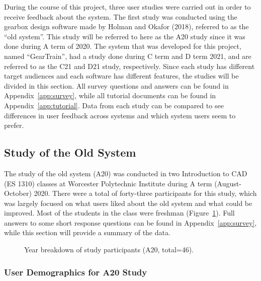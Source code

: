 \begin{doublespace}

During the course of this project, three user studies were carried out in order to receive feedback about the system. The first study was conducted using the gearbox design software made by Holman and Okafor (2018), referred to as the ``old system''. This study will be referred to here as the A20 study since it was done during A term of 2020. The system that was developed for this project, named ``GearTrain'', had a study done during C term and D term 2021, and are referred to as the C21 and D21 study, respectively. Since each study has different target audiences and each software has different features, the studies will be divided in this section. All survey questions and answers can be found in Appendix~\ref{app:survey}, while all tutorial documents can be found in Appendix~\ref{app:tutorial}. Data from each study can be compared to see differences in user feedback across systems and which system users seem to prefer.

\subsection{Study of the Old System}

The study of the old system (A20) was conducted in two Introduction to CAD (ES 1310) classes at Worcester Polytechnic Institute during A term (August-October) 2020. There were a total of forty-three participants for this study, which was largely focused on what users liked about the old system and what could be improved. Most of the students in the class were freshman (Figure~\ref{fig:grades}). Full answers to some short response questions can be found in Appendix~\ref{app:survey}, while this section will provide a summary of the data.

\begin{figure}
    \centering
    \caption{Year breakdown of study participants (A20, total=46).}
    \label{fig:grades}
\end{figure}

\subsubsection{User Demographics for A20 Study}


\end{doublespace}
